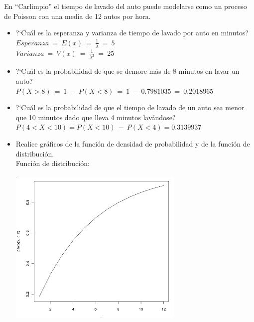 En ``Carlimpio'' el tiempo de lavado del auto puede modelarse como un proceso de Poisson con una media de 12 autos por hora.
\begin{itemize}
	\item ?`Cu\'al es la esperanza y varianza de tiempo de lavado por auto en minutos?\\
		$Esperanza\ =\ E(x)\ =\ \frac{1}{\lambda}\ =\ 5$\\
		$Varianza\ =\ V(x)\ =\ \frac{1}{\lambda^2}\ =\ 25$\\
	\item ?`Cu\'al es la probabilidad de que se demore m\'as de 8 minutos en lavar un auto?\\
		$P(X>8)\ =\ 1\ -\ P(X<8)\ =\ 1\ -\ 0.7981035\ =\ 0.2018965\ $\\
	\item ?`Cu\'al es la probabilidad de que el tiempo de lavado de un auto sea menor que 10 minutos dado que lleva 4 minutos lav\'andose?\\
                $P(4< X < 10) = P(X < 10)\ -\ P(X < 4) = 0.3139937$\\ %
	\item Realice gr\'aficos de la funci\'on de densidad de probabilidad y de la funci\'on de distribuci\'on.\\
		Funci\'on de distribuci\'on:\\
                  \includegraphics[width=3.3in,height=3.3in]{images/2_3-pexp}\\%

\end{itemize}
